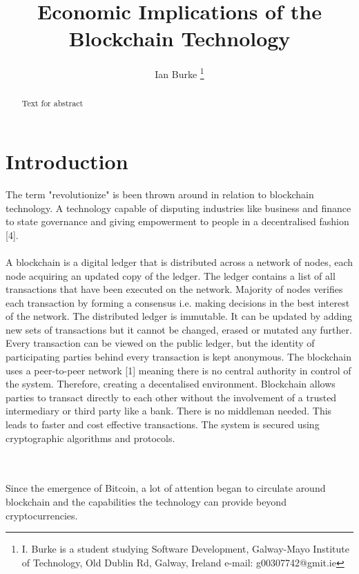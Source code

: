\documentclass[report]{IEEEtran}
\begin{document}
\title{Economic Implications of the Blockchain Technology}
\author{Ian Burke %
\thanks{I. Burke is a student studying
Software Development, Galway-Mayo Institute of Technology, Old Dublin Rd, Galway, Ireland e-mail: g00307742@gmit.ie}%
}

\maketitle

\begin{abstract}
Text for abstract
\end{abstract}


\section{Introduction}
The term "revolutionize" is been thrown around in relation to blockchain technology. A technology capable of disputing industries like business and finance to state governance and giving empowerment to people in a decentralised fashion [4]. \\\\

A blockchain is a digital ledger that is distributed across a network of nodes, each node acquiring an updated copy of the ledger. The ledger contains a list of all transactions that have been executed on the network. Majority of nodes verifies each transaction by forming a consensus i.e. making decisions in the best interest of the network. The distributed ledger is immutable. It can be updated by adding new sets of transactions but it cannot be changed, erased or mutated any further. Every transaction can be viewed on the public ledger, but the identity of participating parties behind every transaction is kept anonymous. The blockchain uses a peer-to-peer network [1] meaning there is no central authority in control of the system. Therefore, creating a decentalised environment. Blockchain allows parties to transact directly to each other without the involvement of a trusted intermediary or third party like a bank. There is no middleman needed. This leads to faster and cost effective transactions. The system is secured using cryptographic algorithms and protocols.

\\\\ Since the emergence of Bitcoin, a lot of attention began to circulate around blockchain and the capabilities the technology can provide beyond cryptocurrencies.  
\end{document}
